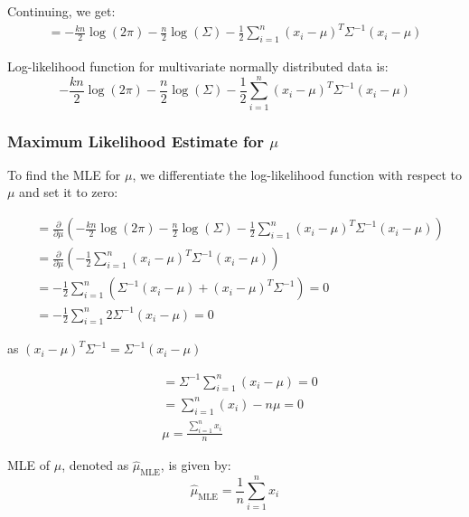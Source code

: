 \documentclass[handout]{beamer}
\begin{document}
\begin{frame}
    Continuing, we get:
    \begin{align*}
        = -\frac{kn}{2}\log(2\pi) -\frac{n}{2}\log(\Sigma) -\frac{1}{2}\sum_{i=1}^n (x_i-\mu)^T\Sigma^{-1}(x_i-\mu)  
        \end{align*}

    \begin{tcolorbox}[colback=metropolisblue!5,colframe=metropolisblue,title=Log Likelihood Function for Multivariate Normal Distribution]
            Log-likelihood function for multivariate normally distributed data is:
            \[
                -\frac{kn}{2}\log(2\pi) -\frac{n}{2}\log(\Sigma) -\frac{1}{2}\sum_{i=1}^n (x_i-\mu)^T\Sigma^{-1}(x_i-\mu)
                \]
        \end{tcolorbox}
\end{frame}

\begin{frame}
    \frametitle{Maximum Likelihood Estimate for $\mu$}
    
    To find the MLE for $\mu$, we differentiate the log-likelihood function with respect to $\mu$ and set it to zero:
    
    \begin{align*}
      &=\frac{\partial}{\partial \mu} \left(-\frac{kn}{2}\log(2\pi) -\frac{n}{2}\log(\Sigma) -\frac{1}{2}\sum_{i=1}^n (x_i-\mu)^T\Sigma^{-1}(x_i-\mu)\right) \\
      &= \frac{\partial}{\partial \mu} \left(-\frac{1}{2} \sum_{i=1}^n (x_i-\mu)^T\Sigma^{-1}(x_i-\mu)\right) \\
      &= -\frac{1}{2}\sum_{i=1}^n \left(\Sigma^{-1}(x_i-\mu) + (x_i-\mu)^T\Sigma^{-1} \right) = 0\\
      &= -\frac{1}{2} \sum_{i=1}^n 2\Sigma^{-1}(x_i-\mu) = 0 
    \end{align*} \centerline{as $(x_i-\mu)^{T}\Sigma^{-1} = \Sigma^{-1}(x_i-\mu)$}
    
\end{frame}

\begin{frame}
    
    \begin{align*}
      &=\Sigma^{-1}\sum_{i=1}^n(x_i-\mu) = 0 \\
      &=\sum_{i=1}^n(x_i) - n\mu = 0 \\
      &\mu = \frac{\sum_{i=1}^n x_i}{n}      
    \end{align*} 

    \begin{tcolorbox}[colback=metropolisblue!5,colframe=metropolisblue,title=Maximum Likelihood Estimate for $\mu$]
        MLE of $\mu$, denoted as $\hat{\mu}_{\text{MLE}}$, is given by:
        \begin{equation*}
            \hat{\mu}_{\text{MLE}} = \frac{1}{n}\sum_{i=1}^n x_i
        \end{equation*}
    \end{tcolorbox}
    
\end{frame}
\end{document}

